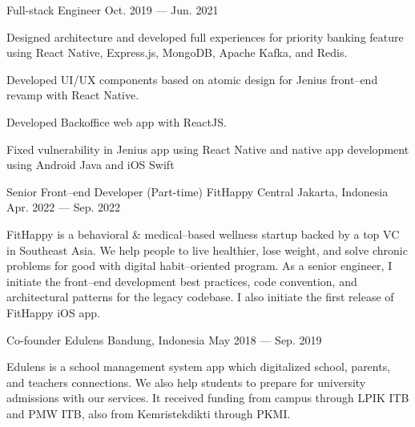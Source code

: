 \begin{cventries}
  \cventry
    {Full-stack Engineer} %
    {} %
    {} %
    {Oct. 2019 --- Jun. 2021} %
    {
      \begin{cvitems} %
        \item {Designed architecture and developed full experiences for priority banking feature using React Native, Express.js, MongoDB, Apache Kafka, and Redis.}
        \item {Developed UI/UX components based on atomic design for Jenius front--end revamp with React Native.}
        \item {Developed Backoffice web app with ReactJS.}
        \item {Fixed vulnerability in Jenius app using React Native and native app development using Android Java and iOS Swift}
      \end{cvitems}
    }

  \cventry
    {Senior Front--end Developer (Part-time)} %
    {FitHappy} %
    {Central Jakarta, Indonesia} %
    {Apr. 2022 --- Sep. 2022} %
    {
      \begin{cvitems} 
        FitHappy is a behavioral \& medical--based wellness startup backed by a top VC in Southeast Asia. 
        We help people to live healthier, lose weight, and solve chronic problems for good with digital habit--oriented program. 
        As a senior engineer, I initiate the front--end development best practices, code convention, and architectural patterns for the legacy codebase. 
        I also initiate the first release of FitHappy iOS app.
      \end{cvitems}
    }
    

  \cventry
    {Co-founder} %
    {Edulens} %
    {Bandung, Indonesia} %
    {May 2018 --- Sep. 2019} %
    {
      \begin{cvitems} %
        Edulens is a school management system app which digitalized school, parents, and teachers connections. 
        We also help students to prepare for university admissions with our services. 
        It received funding from campus through LPIK ITB and PMW ITB, also from Kemristekdikti through PKMI.
      \end{cvitems}
    }


\end{cventries}
